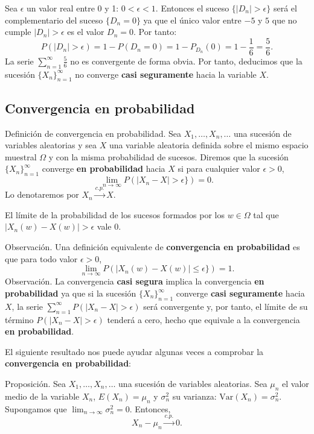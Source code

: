 \documentclass[]{book}
\begin{document}
Sea \(\epsilon\) un valor real entre 0 y 1: \(0<\epsilon <1\). Entonces el suceso \(\{|D_n|>\epsilon\}\) será el complementario del suceso \(\{D_n=0\}\) ya que el único valor entre \(-5\) y \(5\) que no cumple \(|D_n|>\epsilon\) es el valor \(D_n=0\). Por tanto:
\[
P(|D_n|>\epsilon)=1-P(D_n=0)=1-P_{D_n}(0)=1-\frac{1}{6}=\frac{5}{6}.
\]
La serie \(\sum\limits_{n=1}^\infty \frac{5}{6}\) no es convergente de forma obvia. Por tanto, deducimos que la sucesión \(\{X_n\}_{n=1}^\infty\) no converge \textbf{casi seguramente} hacia la variable \(X\).

\hypertarget{convergencia-en-probabilidad}{%
\subsection{Convergencia en probabilidad}\label{convergencia-en-probabilidad}}

 Definición de convergencia en probabilidad.
Sea \(X_1,\ldots,X_n,\ldots\) una sucesión de variables aleatorias y sea \(X\) una variable aleatoria definida sobre el mismo espacio muestral \(\Omega\) y con la misma probabilidad de sucesos. Diremos que la sucesión \(\{X_n\}_{n=1}^\infty\) converge \textbf{en probabilidad} hacia \(X\) si para cualquier valor \(\epsilon >0\),
\[
\lim_{n\to\infty} P(|X_n-X|>\epsilon \})=0.
\]
Lo denotaremos por \(X_n\stackrel{c.p.}{\longrightarrow}X\).

El límite de la probabilidad de los sucesos formados por los \(w\in\Omega\) tal que \(|X_n(w)-X(w)|>\epsilon\) vale 0.

Observación.
Una definición equivalente de \textbf{convergencia en probabilidad} es que para todo valor \(\epsilon >0\),
\[
\lim_{n\to\infty} P(|X_n(w)-X(w)|\leq \epsilon \})=1.
\]
Observación.
La convergencia \textbf{casi segura} implica la convergencia \textbf{en probabilidad} ya que si la sucesión \(\{X_n\}_{n=1}^\infty\) converge \textbf{casi seguramente} hacia \(X\), la serie \(\sum_{n=1}^\infty P(|X_n-X|>\epsilon)\) será convergente y, por tanto, el límite de su término \(P(|X_n-X|>\epsilon)\) tenderá a cero, hecho que equivale a la convergencia \textbf{en probabilidad}.

El siguiente resultado nos puede ayudar algunas veces a comprobar la \textbf{convergencia en probabilidad}:

Proposición.
Sea \(X_1,\ldots,X_n,\ldots\) una sucesión de variables aleatorias. Sea \(\mu_n\) el valor medio de la variable \(X_n\), \(E(X_n)=\mu_n\) y \(\sigma_n^2\) su varianza: \(\mathrm{Var}(X_n)=\sigma_n^2\). Supongamos que \(\lim_{n\to\infty}\sigma_n^2=0\). Entonces,
\[
X_n-\mu_n\stackrel{c.p.}{\longrightarrow} 0.
\]
\end{document}
